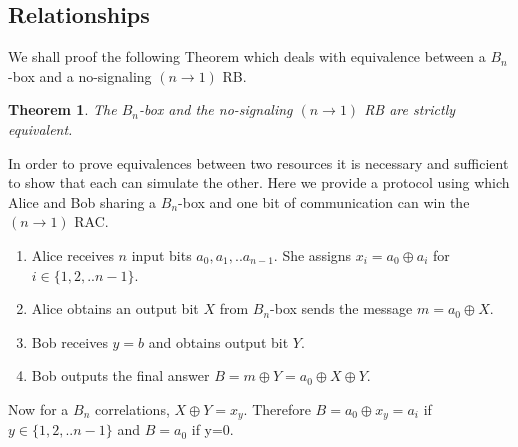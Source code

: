 \documentclass[%
 reprint,
 amsmath,amssymb,
 aps,
]{revtex4-1}
\newtheorem{mydef1}{Theorem}
\begin{document}
\subsection*{Relationships}
\noindent We shall proof the following Theorem which deals with equivalence between a $B_n$-box and a no-signaling $(n\rightarrow 1)$ RB.
\begin{mydef1} \label{thm1}
The $B_n$-box and the no-signaling $(n\rightarrow 1)$ RB are strictly equivalent.
\end{mydef1}
In order to prove equivalences between two resources it is necessary and sufficient to show that each can simulate the other. Here we provide a protocol using which Alice and Bob sharing a $B_n$-box and one bit of communication can win the $(n\rightarrow1)$ RAC. 
\begin{enumerate}
\item Alice receives $n$ input bits $a_0,a_1,..a_{n-1}$. She assigns $x_i=a_0\oplus a_i$ for $i\in\{1,2,..n-1\}$.
\item Alice obtains an output bit $X$ from $B_n$-box sends the message $m=a_0\oplus X$.
\item  Bob receives $y=b$ and obtains output bit  $Y$. 
\item Bob outputs the final answer $B=m\oplus Y=a_0\oplus X \oplus Y$.  
\end{enumerate}
\noindent Now for a $B_n$ correlations, $X\oplus Y=x_y$. Therefore $B=a_0\oplus x_y=a_i$ if $y\in\{1,2,..n-1\}$ and $B=a_0$ if y=0.
\end{document}
